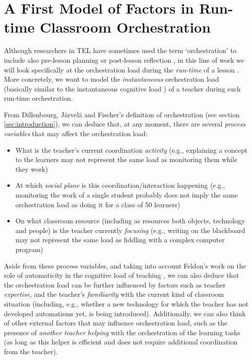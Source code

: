 \documentclass[10pt,journal,compsoc]{IEEEtran}
\begin{document}
\section{A First Model of Factors in Run-time Classroom Orchestration}
\label{sec:model}

Although researchers in TEL have sometimes used the term `orchestration' to include also pre-lesson planning or post-lesson reflection \cite{Prieto2011}, in this line of work we will look specifically at the orchestration load during the \textit{run-time} of a lesson \cite{Dillenbourg2013}. More concretely, we want to model the \textit{instantaneous} orchestration load (basically similar to the instantaneous cognitive load \cite{xie2000prediction}) of a teacher during such run-time orchestration.

From Dillenbourg, J\"arvel\"a and Fischer's definition of orchestration \cite{Dillenbourg2009} (see section \ref{sec:introduction}), we can deduce that, at any moment, there are several \textit{process variables} that may affect the orchestration load: 

\begin{itemize}
\item What is the teacher's current coordination \textit{activity} (e.g., explaining a concept to the learners may not represent the same load as monitoring them while they work)
\item At which \textit{social plane} is this coordination/interaction happening (e.g., monitoring the work of a single student probably does not imply the same orchestration load as doing it for a class of 50 learners)
\item On what classroom resource (including as resources both objects, technology and people) is the teacher currently \textit{focusing} (e.g., writing on the blackboard may not represent the same load as fiddling with a complex computer program)
\end{itemize}

Aside from these process variables, and taking into account Feldon's work on the role of automaticity in the cognitive load of teaching \cite{feldon2007cognitive}, we can also deduce that the orchestration load can be further influenced by factors such as teacher \textit{expertise}, and the teacher's \textit{familiarity} with the current kind of classroom situation (including, e.g., whether a new technology for which the teacher has not developed automatisms yet, is being introduced). Additionally, we can also think of other external factors that may influence orchestration load, such as the presence of \textit{another teacher helping} with the orchestration of the learning tasks (as long as this helper is efficient and does not require additional coordination from the teacher).
\end{document}
